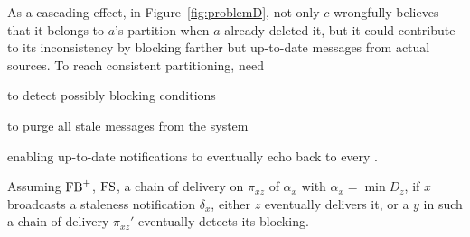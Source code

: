 As a cascading effect, in Figure~\ref{fig:problemD}, not only $c$
wrongfully believes that it belongs to $a$'s partition when $a$
already deleted it, but it could contribute to its inconsistency by
blocking farther but up-to-date messages from actual sources. To reach
consistent partitioning, \processes need
\begin{inparaenum}[(i)]
\item to detect possibly blocking conditions 
\item to purge all stale messages from the system
\item enabling up-to-date notifications to eventually echo back to
  every \process.
\end{inparaenum}

\begin{lemma}
  Assuming $\textup{FB}^+$, $\textup{FS}$, a chain of delivery on
  $\pi_{xz}$ of $\alpha_x$ with $\alpha_x = \min D_z$, if $x$
  broadcasts a staleness notification $\delta_x$, either $z$
  eventually delivers it, or a \process $y$ in such a chain of
  delivery $\pi_{xz}'$ eventually detects its blocking.
\end{lemma}


